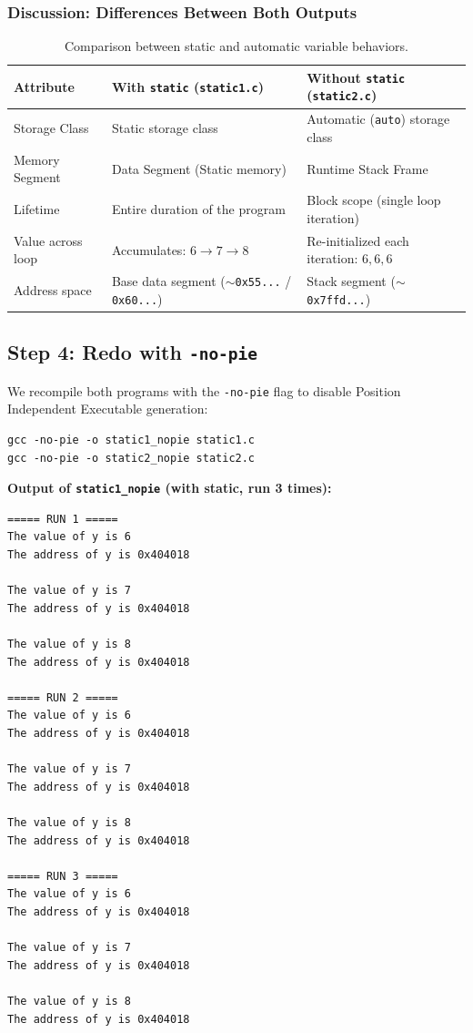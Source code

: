 \documentclass[12pt,a4paper]{article}
\begin{document}
\subsubsection*{Discussion: Differences Between Both Outputs}
\begin{table}[h!]
\centering
\begin{tabular}{@{}lll@{}}
\toprule
\textbf{Attribute} & \textbf{With \texttt{static} (\texttt{static1.c})} & \textbf{Without \texttt{static} (\texttt{static2.c})} \\ \midrule
Storage Class & Static storage class & Automatic (\texttt{auto}) storage class \\
Memory Segment & Data Segment (Static memory) & Runtime Stack Frame \\
Lifetime & Entire duration of the program & Block scope (single loop iteration) \\
Value across loop & Accumulates: $6 \to 7 \to 8$ & Re-initialized each iteration: $6, 6, 6$ \\
Address space & Base data segment ($\sim$\texttt{0x55...} / \texttt{0x60...}) & Stack segment ($\sim$\texttt{0x7ffd...}) \\ \bottomrule
\end{tabular}
\caption{Comparison between static and automatic variable behaviors.}
\end{table}

\subsection{Step 4: Redo with \texttt{-no-pie}}

We recompile both programs with the \texttt{-no-pie} flag to disable Position Independent Executable generation:

\begin{lstlisting}[style=bashstyle]
gcc -no-pie -o static1_nopie static1.c
gcc -no-pie -o static2_nopie static2.c
\end{lstlisting}

\textbf{Output of \texttt{static1\_nopie} (with static, run 3 times):}
\begin{lstlisting}[style=outstyle]
===== RUN 1 =====
The value of y is 6
The address of y is 0x404018

The value of y is 7
The address of y is 0x404018

The value of y is 8
The address of y is 0x404018

===== RUN 2 =====
The value of y is 6
The address of y is 0x404018

The value of y is 7
The address of y is 0x404018

The value of y is 8
The address of y is 0x404018

===== RUN 3 =====
The value of y is 6
The address of y is 0x404018

The value of y is 7
The address of y is 0x404018

The value of y is 8
The address of y is 0x404018
\end{lstlisting}
\end{document}
